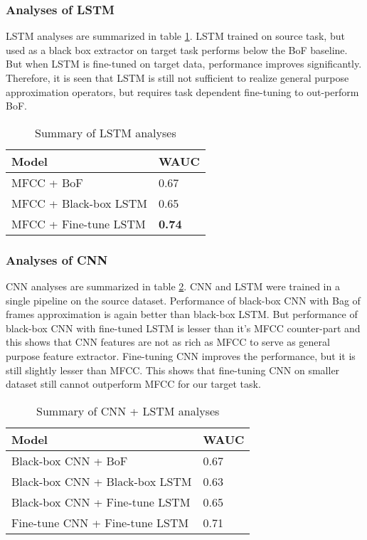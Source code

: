 \subsubsection{Analyses of LSTM}
LSTM analyses are summarized in table \ref{tab:a9}. LSTM trained on source task, but used as a black box extractor on target task performs below the BoF baseline. But when LSTM is fine-tuned on target data, performance improves significantly. Therefore, it is seen that LSTM is still not sufficient to realize general purpose approximation operators, but requires task dependent fine-tuning to out-perform BoF.   

\begin{table}[!htb]
\centering
   \begin{tabular}{ | p{} | p{} |}
    \hline
    \textbf{Model} & \textbf{WAUC} \\ \hline
    MFCC + BoF &  0.67\\ \hline
    MFCC + Black-box LSTM &  0.65 \\ \hline
    MFCC + Fine-tune LSTM  &  \textbf{0.74}\\ \hline
    \hline
    \end{tabular}
    \caption{Summary of LSTM analyses}\label{tab:a9}
\end{table}
\FloatBarrier

\subsubsection{Analyses of CNN}
CNN analyses are summarized in table \ref{tab:a10}. CNN and LSTM were trained in a single pipeline on the source dataset. Performance of black-box CNN with Bag of frames approximation is again better than black-box LSTM. But performance of black-box CNN with fine-tuned LSTM is lesser than it's MFCC counter-part and this shows that CNN features are not as rich as MFCC to serve as general purpose feature extractor. Fine-tuning CNN improves the performance, but it is still slightly lesser than MFCC. This shows that fine-tuning CNN on smaller dataset still cannot outperform MFCC for our target task.
  
\begin{table}[!htb]
\centering
   \begin{tabular}{ | p{} | p{} |}
    \hline
    \textbf{Model} & \textbf{WAUC} \\ \hline
    Black-box CNN + BoF & 0.67 \\ \hline 
    Black-box CNN + Black-box LSTM & 0.63 \\ \hline 
    Black-box CNN + Fine-tune LSTM & 0.65 \\ \hline
    Fine-tune CNN + Fine-tune LSTM &  0.71 \\ \hline
    \hline
    \end{tabular}
    \caption{Summary of CNN + LSTM analyses}\label{tab:a10}
\end{table}
\FloatBarrier



